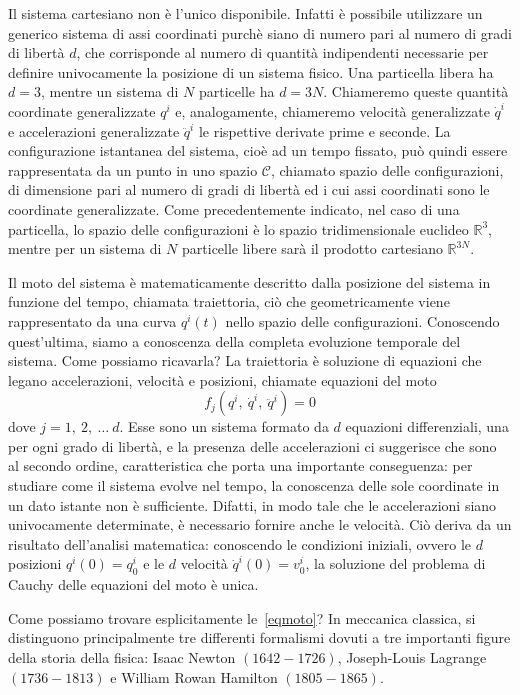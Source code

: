     Il sistema cartesiano non è l'unico disponibile. Infatti è possibile utilizzare un generico sistema di assi coordinati purchè siano di numero pari al numero di gradi di libertà $d$, che corrisponde al numero di quantità indipendenti necessarie per definire univocamente la posizione di un sistema fisico. Una particella libera ha $d = 3$, mentre un sistema di $N$ particelle ha $d = 3N$. Chiameremo queste quantità coordinate generalizzate $q^i$ e, analogamente, chiameremo velocità generalizzate $\dot q^i$ e accelerazioni generalizzate $\ddot q^i$ le rispettive derivate prime e seconde. La configurazione istantanea del sistema, cioè ad un tempo fissato, può quindi essere rappresentata da un punto in uno spazio $\mathcal C$, chiamato spazio delle configurazioni, di dimensione pari al numero di gradi di libertà ed i cui assi coordinati sono le coordinate generalizzate. Come precedentemente indicato, nel caso di una particella, lo spazio delle configurazioni è lo spazio tridimensionale euclideo $\mathbb R^3$, mentre per un sistema di $N$ particelle libere sarà il prodotto cartesiano $\mathbb R^{3N}$.
    
    Il moto del sistema è matematicamente descritto dalla posizione del sistema in funzione del tempo, chiamata traiettoria, ciò che geometricamente viene rappresentato da una curva $q^i(t)$ nello spazio delle configurazioni. Conoscendo quest'ultima, siamo a conoscenza della completa evoluzione temporale del sistema. Come possiamo ricavarla? La traiettoria è soluzione di equazioni che legano accelerazioni, velocità e posizioni, chiamate equazioni del moto
    \begin{equation} \label{eqmoto}
        f_j(q^i, ~ \dot q^i, ~ \ddot q^i) = 0
    \end{equation}
    dove $j = 1, ~2, ~\ldots ~d$. Esse sono un sistema formato da $d$ equazioni differenziali, una per ogni grado di libertà, e la presenza delle accelerazioni ci suggerisce che sono al secondo ordine, caratteristica che porta una importante conseguenza: per studiare come il sistema evolve nel tempo, la conoscenza delle sole coordinate in un dato istante non è sufficiente. Difatti, in modo tale che le accelerazioni siano univocamente determinate, è necessario fornire anche le velocità. Ciò deriva da un risultato dell'analisi matematica: conoscendo le condizioni iniziali, ovvero le $d$ posizioni $q^i(0) = q^i_0$ e le $d$ velocità $\dot q^i(0) = v^i_0$, la soluzione del problema di Cauchy delle equazioni del moto è unica. 
    
    Come possiamo trovare esplicitamente le~\eqref{eqmoto}? In meccanica classica, si distinguono principalmente tre differenti formalismi dovuti a tre importanti figure della storia della fisica: Isaac Newton $(1642-1726)$, Joseph-Louis Lagrange $(1736-1813)$ e William Rowan Hamilton $(1805-1865)$. 

